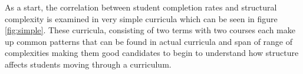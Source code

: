\documentclass[botnum, fleqn]{unmeethesis}
\begin{document}

    As a start, the correlation between student completion rates and structural complexity is examined in very simple curricula which can be seen in figure \ref{fig:simple}. These curricula, consisting of two terms with two courses each make up common patterns that can be found in actual curricula and span of range of complexities making them good candidates to begin to understand how structure affects students moving through a curriculum.
\end{document}
